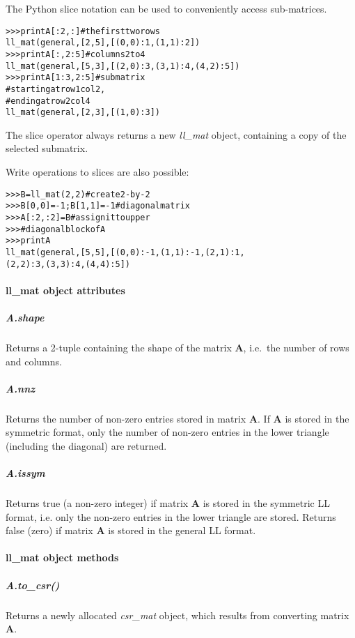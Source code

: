 \documentclass[a4paper]{article}
\newcommand{\mat}[1]{\ensuremath{\boldsymbol{#1}}}
\newlength{\pyindent} \newlength{\pyminipagewidth}
\newenvironment{pyinline}{\begin{trivlist}\item\hspace*{\pyindent}\begin{minipage}{\pyminipagewidth}\small\begin{alltt}}
      {\end{alltt}\end{minipage}\end{trivlist}}
\begin{document}
\noindent The Python slice notation can be used to conveniently access
sub-matrices.
\begin{pyinline}
>>> print A[:2,:]     # the first two rows
ll_mat(general, [2,5], [(0,0): 1, (1,1): 2])
>>> print A[:,2:5]    # columns 2 to 4
ll_mat(general, [5,3], [(2,0): 3, (3,1): 4, (4,2): 5])
>>> print A[1:3,2:5]  # submatrix 
                      # starting at row 1 col 2,
                      # ending at row 2 col 4
ll_mat(general, [2,3], [(1,0): 3])
\end{pyinline}
The slice operator always returns a new \textit{ll\_mat} object,
containing a copy of the selected submatrix.

Write operations to slices are also possible:
\begin{pyinline}
>>> B = ll_mat(2, 2)           # create 2-by-2
>>> B[0,0] = -1; B[1,1] = -1   # diagonal matrix
>>> A[:2,:2] = B               # assign it to upper
>>>                            # diagonal block of A
>>> print A
ll_mat(general, [5,5], [(0,0): -1, (1,1): -1, (2,1): 1, 
(2,2): 3, (3,3): 4, (4,4): 5])
\end{pyinline}

\paragraph{ll\_mat object attributes}
%

\subparagraph{A.shape}
%
Returns a 2-tuple containing the shape of the matrix $\mat{A}$, i.e.\ 
the number of rows and columns.

\subparagraph{A.nnz}
%
Returns the number of non-zero entries stored in matrix $\mat{A}$. If
$\mat{A}$ is stored in the symmetric format, only the number of
non-zero entries in the lower triangle (including the diagonal) are
returned.

\subparagraph{A.issym}
%
Returns true (a non-zero integer) if matrix $\mat{A}$ is stored in the
symmetric LL format, i.e. only the non-zero entries in the lower
triangle are stored. Returns false (zero) if matrix $\mat{A}$ is
stored in the general LL format.

\paragraph{ll\_mat object methods}
%

\subparagraph{A.to\_csr()}
%
Returns a newly allocated \textit{csr\_mat} object, which results from
converting matrix $\mat{A}$.
\end{document}
